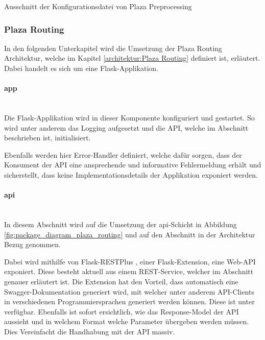 \begin{listing}[ht]
    \inputminted{YAML}{projectdoc/listing/preprocess_config.yml}
    \caption{Ausschnitt der Konfigurationsdatei von Plaza Preprocessing}
    \label{listing:preprocess_config}
\end{listing}


\subsubsection{Plaza Routing}
\label{impl:Plaza Routing}
In den folgenden Unterkapitel wird die Umsetzung der Plaza Routing Architektur, welche im Kapitel \ref{architektur:Plaza Routing} definiert ist, erläutert. Dabei handelt es sich um eine Flask-Applikation\cite{flask}.

\paragraph{app}\label{impl:app-layer}~\\
Die Flask-Applikation\cite{flask} wird in dieser Komponente konfiguriert und gestartet. So wird unter anderem das Logging aufgesetzt und die \ac{API}, welche im Abschnitt  beschrieben ist, initialisiert.

Ebenfalls werden hier Error-Handler definiert, welche dafür sorgen, dass der Konsument der \ac{API} eine ansprechende und informative Fehlermeldung erhält und sicherstellt, dass keine Implementationsdetails der Applikation exponiert werden.

\paragraph{api}\label{impl:Plaza Routing api}~\\
In diesem Abschnitt wird auf die Umsetzung der api-Schicht in Abbildung \ref{fig:package_diagram_plaza_routing} und auf den Abschnitt  in der Architektur Bezug genommen.

Dabei wird mithilfe von Flask-RESTPlus \cite{flask-restplus}, einer Flask-Extension, eine Web-\ac{API} exponiert. Diese besteht aktuell aus einem \ac{REST}-Service, welcher im Abschnitt  genauer erläutert ist. Die Extension hat den Vorteil, dass automatisch eine Swagger-Dokumentation \cite{swagger} generiert wird, mit welcher unter anderem \ac{API}-Clients in verschiedenen Programmiersprachen generiert werden können. Diese ist unter \cite{plaza-routing-api-swaggerui} verfügbar. Ebenfalls ist sofort ersichtlich, wie das Response-Model der \ac{API} aussieht und in welchem Format welche Parameter übergeben werden müssen. Dies Vereinfacht die Handhabung mit der \ac{API} massiv.

